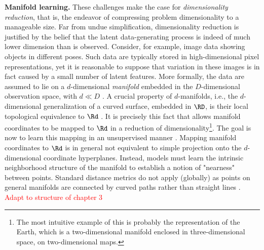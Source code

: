 \textbf{Manifold learning.}
These challenges make the case for \textit{dimensionality reduction}, that is, 
the endeavor of compressing problem dimensionality to a manageable size. 
Far from undue simplification, dimensionality reduction is justified by the 
belief that the latent data-generating process is indeed of much lower dimension 
than is observed.
Consider, for example, image data showing objects in different poses.
Such data are typically stored in high-dimensional pixel representations, yet it 
is reasonable to suppose that variation in these images is in fact caused by a 
small number of latent features.
More formally, the data are assumed to lie on a $d$-dimensional 
\textit{manifold} embedded in the $D$-dimensional observation space, with 
$d \ll D$ \citep{cayton2005}.
A crucial property of $d$-manifolds, i.e., the $d$-dimensional generalization of
a curved surface, embedded in $\RD$, is their local topological equivalence to 
$\Rd$ \citep{mafu2011}.
It is precisely this fact that allows manifold coordinates to be mapped to 
$\Rd$ in a reduction of dimensionality\footnote{
The most intuitive example of this is probably the representation 
of the Earth, which is a two-dimensional manifold enclosed in three-dimensional 
space, on two-dimensional maps.}.
The goal is now to learn this mapping in an unsupervised manner 
\citep{cayton2005}.
Mapping manifold coordinates to $\Rd$ is in general not equivalent to simple 
projection onto the $d$-dimensional coordinate hyperplanes.
Instead, models must learn the intrinsic neighborhood structure of the manifold
to establish a notion of "nearness" between points.
Standard distance metrics do not apply (globally) as points on general manifolds 
are connected by curved paths rather than straight lines \citep{mafu2011}.
\\

\textcolor{red}{Adapt to structure of chapter 3}


